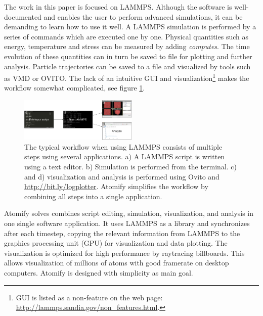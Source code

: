 \documentclass[aps,pre,twocolumn,letterpaper,floatfix,nofootinbib]{revtex4}
\begin{document}
The work in this paper is focused on LAMMPS.
Although the software is well-documented and enables the user to perform
advanced simulations, it can be demanding to learn how to use it well.
A LAMMPS simulation is performed by a series of commands which are executed one by
one.
Physical quantities such as energy, temperature and stress can be measured by
adding \textit{computes}.
The time evolution of these quantities can in turn be saved to file for plotting
and further analysis.
Particle trajectories can be saved to a file and visualized by tools such as
VMD\cite{Humphrey1996Vmd} or OVITO\cite{Stukowski2009Visualization}.
The lack of an intuitive GUI and visualization\footnote{GUI is listed as a non-feature on the web page:
\url{http://lammps.sandia.gov/non_features.html}.} makes the workflow somewhat
complicated, see figure \ref{fig:flowchart}.

\begin{figure}
	\centering
	\includegraphics[width=0.5\textwidth]{flowchart.png}
	\caption{The typical workflow when using LAMMPS consists of multiple steps using several applications. a) A LAMMPS script is written using a text editor. b) Simulation is performed from the terminal. c) and d) visualization and analysis is performed using Ovito and \url{http://bit.ly/logplotter}. Atomify simplifies the workflow by combining all steps into a single application. }
	\label{fig:flowchart}
\end{figure}

Atomify solves combines script editing, simulation,
visualization, and analysis in one single software application.
It uses LAMMPS as a library and synchronizes after each timestep,
copying the relevant information from LAMMPS to the graphics processing unit
(GPU) for visualization and data plotting.
The visualization is optimized for high performance by raytracing billboards.
This allows visualization of millions of atoms with good framerate on desktop
computers. Atomify is designed with simplicity as main goal.
\end{document}
